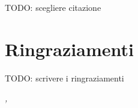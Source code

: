 \cleardoublepage
{}
{}

\begin{flushright}
    TODO: scegliere citazione
\end{flushright}


\bigskip

\begingroup
\let\clearpage\relax
\let\cleardoublepage\relax
\let\cleardoublepage\relax

\chapter*{Ringraziamenti}





TODO: scrivere i ringraziamenti
\bigskip

\noindent\textit{\myLocation, \myTime}
\hfill \myName

\endgroup

